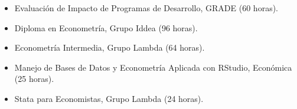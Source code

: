 \documentclass[11pt,a4paper]{article}
\begin{document}
\begin{itemize}[
  leftmargin=1.1em,
  itemsep=1pt,
  topsep=0pt
]

  \item Evaluación de Impacto de Programas de Desarrollo, GRADE (60 horas).

  \item Diploma en Econometría, Grupo Iddea (96 horas).

  \item Econometría Intermedia, Grupo Lambda (64 horas).

  \item Manejo de Bases de Datos y Econometría Aplicada con RStudio, Económica (25 horas).

  \item Stata para Economistas, Grupo Lambda (24 horas).

\end{itemize}

\end{document}
